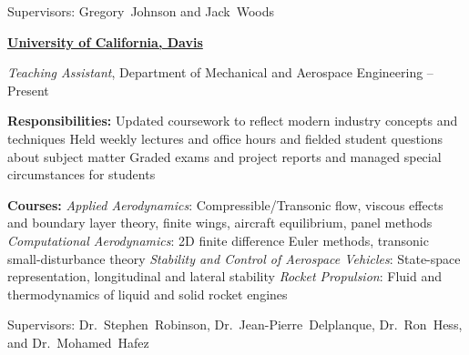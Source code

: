 \documentclass[letterpaper,MMMyyyy,nonstop]{simpleresumecv}
\begin{document}
\begin{body}
\begin{detail}
\SubItem
Supervisors:
Gregory~Johnson and
Jack~Woods
\end{detail}


\Gap

\href{http://mae.ucdavis.edu/}
{\textbf{University of California, Davis}}

\GapNoBreak
\BulletItem
\emph{Teaching Assistant}, Department of Mechanical and Aerospace Engineering
\hfill
{} --
Present
\begin{detail}
\SubItem
\textbf{Responsibilities:}
\SubBulletItem
Updated coursework to reflect modern industry concepts and techniques
\SubBulletItem
Held weekly lectures and office hours and fielded student questions about subject matter
\SubBulletItem
Graded exams and project reports and managed special circumstances for students

\SubItem
\textbf{Courses:}
\SubBulletItem
\emph{Applied Aerodynamics}:
    {\small Compressible/Transonic flow, viscous effects and boundary layer theory, finite wings, aircraft equilibrium, panel methods}
\SubBulletItem
\emph{Computational Aerodynamics}:
    {\small 2D finite difference Euler methods, transonic small-disturbance theory}
\SubBulletItem
\emph{Stability and Control of Aerospace Vehicles}:
    {\small State-space representation, longitudinal and lateral stability}
\SubBulletItem
\emph{Rocket Propulsion}:
    {\small Fluid and thermodynamics of liquid and solid rocket engines}

\SubItem
Supervisors:
Dr.~Stephen~Robinson,
Dr.~Jean-Pierre~Delplanque,
Dr.~Ron~Hess, and
Dr.~Mohamed~Hafez


\end{detail}







\end{body}
\end{document}

